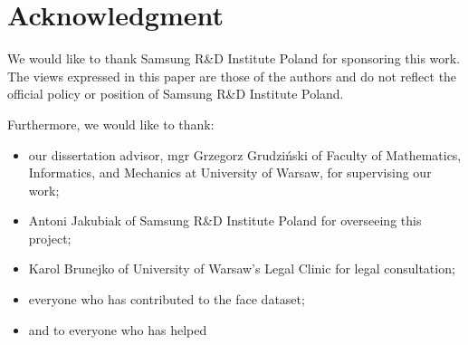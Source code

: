 \section*{Acknowledgment}
We would like to thank Samsung R\&D Institute Poland for sponsoring this work.
The views expressed in this paper are those of the authors and do not reflect
the official policy or position of Samsung R\&D Institute Poland.

\bigskip \noindent
Furthermore, we would like to thank:
\begin{itemize}
    \item our dissertation advisor,  mgr Grzegorz Grudziński of Faculty of Mathematics,
          Informatics, and Mechanics at University of Warsaw, for supervising our work;
    \item Antoni Jakubiak of Samsung R\&D Institute Poland for overseeing this project;
    \item Karol Brunejko of University of Warsaw's Legal Clinic for legal consultation;
    \item everyone who has contributed to the face dataset;
    \item and to everyone who has helped
\end{itemize}
